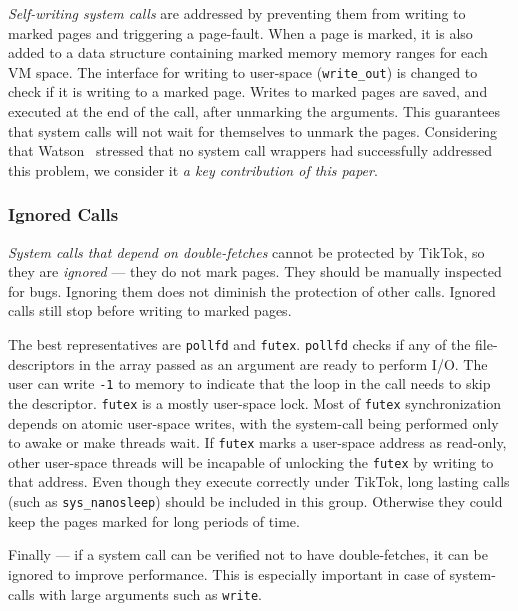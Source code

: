 \documentclass[conference]{IEEEtran}
\newcommand{\sysname}{TikTok}
\begin{document}
\emph{Self-writing system calls} are addressed by preventing them from writing
to marked pages and triggering a page-fault. When a page is marked, it is also
added to a data structure containing marked memory memory ranges for each VM
space. The interface
for writing to user-space (\texttt{write\_out}) is changed to check if it is
writing to a marked page. Writes to marked pages are saved, and executed at the
end of the call, after unmarking the arguments. This guarantees that system
calls will not wait for themselves to unmark the pages. Considering that
Watson~\cite{watson2007exploiting} stressed that no system call wrappers had
successfully addressed this problem, we consider it \emph{a key contribution of
this paper}.

\subsubsection{Ignored Calls}

\emph{System calls that depend on double-fetches} cannot be protected by
\sysname{}, so they are \emph{ignored} --- they do not mark pages. They should
be manually inspected for bugs. Ignoring them does not diminish the protection
of other calls. Ignored calls still stop before writing to marked pages.

The best representatives are \texttt{pollfd} and \texttt{futex}. \texttt{pollfd}
checks if any of the file-descriptors in the array passed as an argument are
ready to perform I/O. The user can write \texttt{-1} to memory to indicate that
the loop in the call needs to skip the descriptor. \texttt{futex} is a mostly
user-space lock. Most of \texttt{futex} synchronization depends on atomic
user-space writes, with the system-call being performed only to awake or make
threads wait. If \texttt{futex} marks a user-space address as read-only, other
user-space threads will be incapable of unlocking the \texttt{futex} by writing
to that address. Even though they execute correctly under \sysname{}, long
lasting calls (such as \texttt{sys\_nanosleep}) should be included in this
group. Otherwise they could keep the pages marked for long periods of time.

Finally --- if a system call can be verified not to have double-fetches, it can
be ignored to improve performance. This is especially important in case of
system-calls with large arguments such as \texttt{write}.

\end{document}
